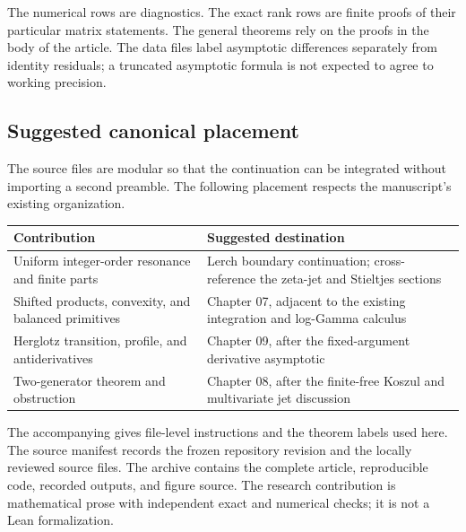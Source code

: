 The numerical rows are diagnostics. The exact rank rows are finite proofs
of their particular matrix statements. The general theorems rely on the
proofs in the body of the article. The data files label asymptotic
differences separately from identity residuals; a truncated asymptotic
formula is not expected to agree to working precision.

\subsection{Suggested canonical placement}
The source files are modular so that the continuation can be integrated
without importing a second preamble. The following placement respects the
manuscript's existing organization.
\begin{center}
\begin{tabular}{@{}>{\raggedright\arraybackslash}p{}>{\raggedright\arraybackslash}p{}@{}}
\toprule
Contribution & Suggested destination\\
\midrule
Uniform integer-order resonance and finite parts & Lerch boundary
continuation; cross-reference the zeta-jet and Stieltjes sections\\[4pt]
Shifted products, convexity, and balanced primitives & Chapter 07,
adjacent to the existing integration and log-Gamma calculus\\[4pt]
Herglotz transition, profile, and antiderivatives & Chapter 09,
after the fixed-argument derivative asymptotic\\[4pt]
Two-generator theorem and obstruction & Chapter 08,
after the finite-free Koszul and multivariate jet discussion\\
\bottomrule
\end{tabular}
\end{center}

The accompanying  gives file-level instructions and
the theorem labels used here. The source manifest records the frozen
repository revision and the locally reviewed source files. The archive
contains the complete article, reproducible code, recorded outputs, and
figure source. The research contribution is mathematical prose with
independent exact and numerical checks; it is not a Lean formalization.

